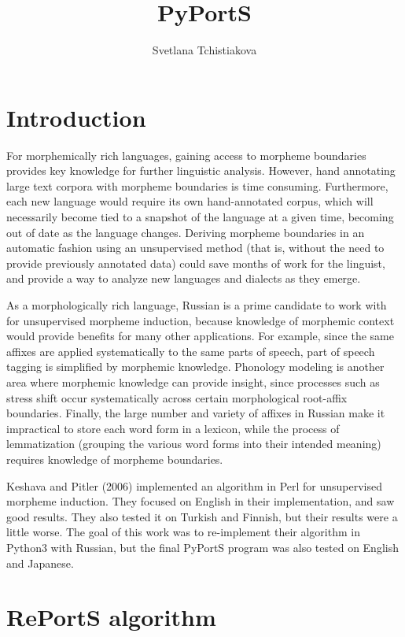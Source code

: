\documentclass[paper=a4, fontsize=11pt]{article}
\title{PyPortS}
\author{Svetlana Tchistiakova}
\date{}
\begin{document}
\maketitle

\section{Introduction}

For morphemically rich languages, gaining access to morpheme boundaries provides key knowledge for further linguistic analysis. However, hand annotating large text corpora with morpheme boundaries is time consuming. Furthermore, each new language would require its own hand-annotated corpus, which will necessarily become tied to a snapshot of the language at a given time, becoming out of date as the language changes. Deriving morpheme boundaries in an automatic fashion using an unsupervised method (that is, without the need to provide previously annotated data) could save months of work for the linguist, and provide a way to analyze new languages and dialects as they emerge. 

As a morphologically rich language, Russian is a prime candidate to work with for unsupervised morpheme induction, because knowledge of morphemic context would provide benefits for many other applications. For example, since the same affixes are applied systematically to the same parts of speech, part of speech tagging is simplified by morphemic knowledge. Phonology modeling is another area where morphemic knowledge can provide insight, since processes such as stress shift occur systematically across certain morphological root-affix boundaries. Finally, the large number and variety of affixes in Russian make it impractical to store each word form in a lexicon, while the process of lemmatization (grouping the various word forms into their intended meaning) requires knowledge of morpheme boundaries.

Keshava and Pitler (2006) implemented an algorithm in Perl for unsupervised morpheme induction. \cite{keshava2006} They focused on English in their implementation, and saw good results. They also tested it on Turkish and Finnish, but their results were a little worse. The goal of this work was to re-implement their algorithm in Python3 with Russian, but the final PyPortS program was also tested on English and Japanese.


\section{RePortS algorithm}
\end{document}
